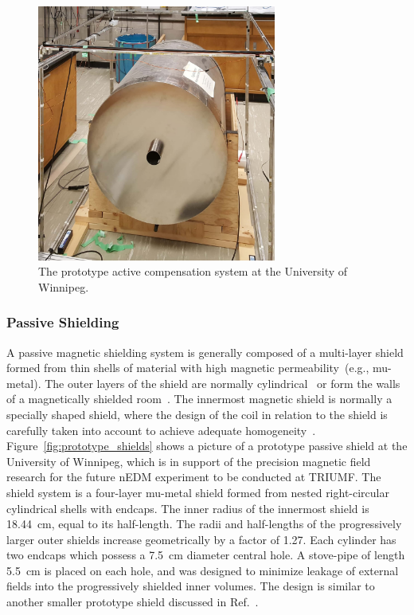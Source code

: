 \begin{figure}[h!]
  \centering
  \includegraphics[width=0.7\textwidth]{active_prototype.jpg}
  \caption[TUCAN's prototype active compensation system]{The prototype
    active compensation system at the University of Winnipeg.}
  \label{fig:prototype_active}
\end{figure}

\subsubsection{Passive Shielding}


A passive magnetic shielding system is generally composed of a
multi-layer shield formed from thin shells of material with high
magnetic permeability~(e.g., mu-metal).  The outer layers of the
shield are normally cylindrical~\cite{serebrov2014new,baker2011search}
or form the walls of a magnetically shielded
room~\cite{altarev2014magnetically,altarev2015minimizing}.  The
innermost magnetic shield is normally a specially shaped shield, where
the design of the coil in relation to the shield is carefully taken
into account to achieve adequate
homogeneity~\cite{Baker2006,Kirch_talk,altarev2012next}. Figure~\ref{fig:prototype_shields}
shows a picture of a prototype passive shield at the University of
Winnipeg, which is in support of the precision magnetic field research
for the future nEDM experiment to be conducted at TRIUMF.  The shield
system is a four-layer mu-metal shield formed from nested
right-circular cylindrical shells with endcaps.  The inner radius of
the innermost shield is 18.44~cm, equal to its half-length. The radii
and half-lengths of the progressively larger outer shields increase
geometrically by a factor of 1.27.  Each cylinder has two endcaps
which possess a 7.5~cm diameter central hole.  A stove-pipe of length
5.5~cm is placed on each hole, and was designed to minimize leakage of
external fields into the progressively shielded inner volumes.  The
design is similar to another smaller prototype shield discussed in
Ref.~\cite{martin2015large}.

